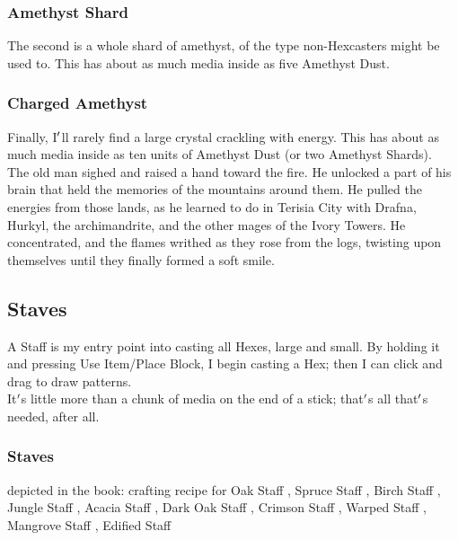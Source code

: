 \documentclass[12pt]{article}
\begin{document}
  \label{sec: items/amethyst@shard}

  \subsubsection*{ Amethyst Shard }
      The second is a whole shard of amethyst, of the type non-Hexcasters might be used to. This has about as much media inside as five Amethyst Dust.\\


  \label{sec: items/amethyst@charged}

  \subsubsection*{ Charged Amethyst }
      Finally, I$\rq$ll rarely find a large crystal crackling with energy. This has about as much media inside as ten units of Amethyst Dust (or two Amethyst Shards).\\


  
    The old man sighed and raised a hand toward the fire. He unlocked a part of his brain that held the memories of the mountains around them. He pulled the energies from those lands, as he learned to do in Terisia City with Drafna, Hurkyl, the archimandrite, and the other mages of the Ivory Towers. He concentrated, and the flames writhed as they rose from the logs, twisting upon themselves until they finally formed a soft smile.\\

\newpage

\label{sec:items/staff}
\subsection*{Staves}


  
    A Staff is my entry point into casting all Hexes, large and small. By holding it and pressing Use Item/Place Block, I begin casting a Hex; then I can click and drag to draw patterns.\\It$\rq$s little more than a chunk of media on the end of a stick; that$\rq$s all that$\rq$s needed, after all.\\


  \subsubsection*{Staves}

  depicted in the book: crafting recipe for 
    Oak Staff
,     Spruce Staff
,     Birch Staff
,     Jungle Staff
,     Acacia Staff
,     Dark Oak Staff
,     Crimson Staff
,     Warped Staff
,     Mangrove Staff
,     Edified Staff
\\
\end{document}
